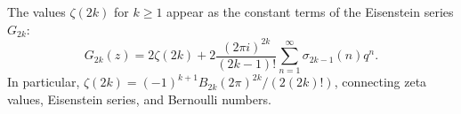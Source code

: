 The values $\zeta(2k)$ for $k \geq 1$ appear as the constant terms of the Eisenstein series $G_{2k}$:
$$
G_{2k}(z) = 2\zeta(2k) + 2\frac{(2\pi i)^{2k}}{(2k-1)!} \sum_{n=1}^\infty \sigma_{2k-1}(n) q^n.
$$
In particular, $\zeta(2k) = (-1)^{k+1} B_{2k} (2\pi)^{2k} / (2(2k)!)$, connecting zeta values, Eisenstein series, and Bernoulli numbers.
